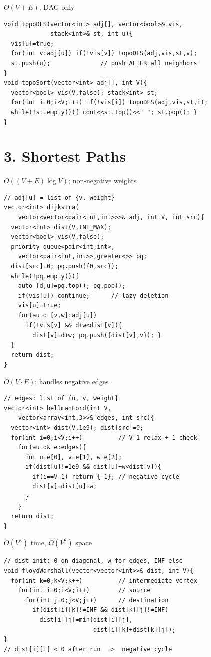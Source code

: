 \documentclass[8pt,landscape,a4paper]{extarticle}
\newcommand{\algo}[2]{\vspace{1pt}{\bfseries #1}\hfill{\footnotesize\color{cx}#2}\par\vspace{-1pt}}
\begin{document}
\begin{multicols}{3}
\algo{Topological Sort (DFS)}{$O(V+E)$, DAG only}
\begin{lstlisting}
void topoDFS(vector<int> adj[], vector<bool>& vis,
             stack<int>& st, int u){
  vis[u]=true;
  for(int v:adj[u]) if(!vis[v]) topoDFS(adj,vis,st,v);
  st.push(u);              // push AFTER all neighbors
}
void topoSort(vector<int> adj[], int V){
  vector<bool> vis(V,false); stack<int> st;
  for(int i=0;i<V;i++) if(!vis[i]) topoDFS(adj,vis,st,i);
  while(!st.empty()){ cout<<st.top()<<" "; st.pop(); }
}
\end{lstlisting}

\section*{3. Shortest Paths}

\algo{Dijkstra (SSSP)}{$O((V{+}E)\log V)$; non-negative weights}
\begin{lstlisting}
// adj[u] = list of {v, weight}
vector<int> dijkstra(
    vector<vector<pair<int,int>>>& adj, int V, int src){
  vector<int> dist(V,INT_MAX);
  vector<bool> vis(V,false);
  priority_queue<pair<int,int>,
    vector<pair<int,int>>,greater<>> pq;
  dist[src]=0; pq.push({0,src});
  while(!pq.empty()){
    auto [d,u]=pq.top(); pq.pop();
    if(vis[u]) continue;      // lazy deletion
    vis[u]=true;
    for(auto [v,w]:adj[u])
      if(!vis[v] && d+w<dist[v]){
        dist[v]=d+w; pq.push({dist[v],v}); }
  }
  return dist;
}
\end{lstlisting}

\algo{Bellman-Ford (SSSP)}{$O(V\cdot E)$; handles negative edges}
\begin{lstlisting}
// edges: list of {u, v, weight}
vector<int> bellmanFord(int V,
    vector<array<int,3>>& edges, int src){
  vector<int> dist(V,1e9); dist[src]=0;
  for(int i=0;i<V;i++)          // V-1 relax + 1 check
    for(auto& e:edges){
      int u=e[0], v=e[1], w=e[2];
      if(dist[u]!=1e9 && dist[u]+w<dist[v]){
        if(i==V-1) return {-1}; // negative cycle
        dist[v]=dist[u]+w;
      }
    }
  return dist;
}
\end{lstlisting}

\algo{Floyd-Warshall (APSP)}{$O(V^3)$ time, $O(V^2)$ space}
\begin{lstlisting}
// dist init: 0 on diagonal, w for edges, INF else
void floydWarshall(vector<vector<int>>& dist, int V){
  for(int k=0;k<V;k++)          // intermediate vertex
    for(int i=0;i<V;i++)        // source
      for(int j=0;j<V;j++)      // destination
        if(dist[i][k]!=INF && dist[k][j]!=INF)
          dist[i][j]=min(dist[i][j],
                         dist[i][k]+dist[k][j]);
}
// dist[i][i] < 0 after run  =>  negative cycle
\end{lstlisting}


\end{multicols}
\end{document}
